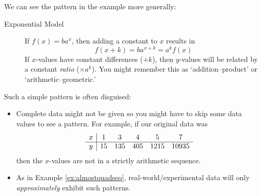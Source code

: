 We can see the pattern in the example more generally:
\begin{description}
	\item[Exponential Model] If $f(x)=ba^x$, then adding a constant to $x$ results in
		\[f(x+k)=ba^{x+k}=a^kf(x)\]
		If $x$-values have constant differences ($+k$), then $y$-values will be related by a constant \emph{ratio} ($\times a^k$). You might remember this as `addition--product' or `arithmetic--geometric.'
\end{description}

Such a simple pattern is often disguised:
\begin{itemize}
  \item Complete data might not be given so you might have to skip some data values to see a pattern. For example, if our original data was
  \[\begin{array}[t]{c|ccccc}
		x&1&3&4&5&7\\\hline
		y&15&135&405&1215&10935
		\end{array}\]
		then the $x$-values are not in a strictly arithmetic sequence.
	\item As in Example \ref{ex:almostquadseq}, real-world/experimental data will only \emph{approximately} exhibit such patterns.
\end{itemize}
\goodbreak



